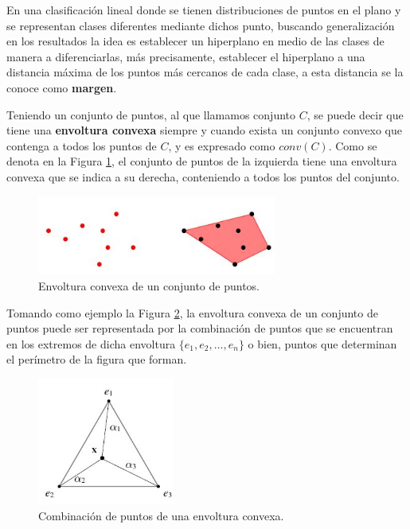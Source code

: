{En una clasificaci\'on lineal donde se tienen distribuciones de puntos en el plano y se representan clases diferentes mediante dichos punto, buscando generalizaci\'on en los resultados la idea es establecer un hiperplano en medio de las clases de manera a diferenciarlas, m\'as precisamente, establecer el hiperplano a una distancia m\'axima de los puntos m\'as cercanos de cada clase, a esta distancia se la conoce como \textbf{margen}.
\newline

Teniendo un conjunto de puntos, al que llamamos conjunto $C$, se puede decir que tiene una \textbf{envoltura convexa} siempre y cuando exista un conjunto convexo que contenga a todos los puntos de $C$, y es expresado como $conv(C)$. Como se denota en la Figura \ref{svm:est_convexa}, el conjunto de puntos de la izquierda tiene una envoltura convexa que se indica a su derecha, conteniendo a todos los puntos del conjunto.

\begin{figure}[h]
\centering
\includegraphics[width=0.7\textwidth]{est_convexa.png}
\caption{Envoltura convexa de un conjunto de puntos.}
\label{svm:est_convexa}
\end{figure}

Tomando como ejemplo la Figura \ref{svm:envoltura_puntos}, la envoltura convexa de un conjunto de puntos puede ser representada por la combinaci\'on de puntos que se encuentran en los extremos de dicha envoltura $\{e_{1},e_{2},\ldots,e_{n}\}$ o bien, puntos que determinan el per\'imetro de la figura que forman.

\begin{figure}[h]
\centering
\includegraphics[width=0.4\textwidth]{envoltura_puntos.png}
\caption{Combinaci\'on de puntos de una envoltura convexa.}
\label{svm:envoltura_puntos}
\end{figure}

}
